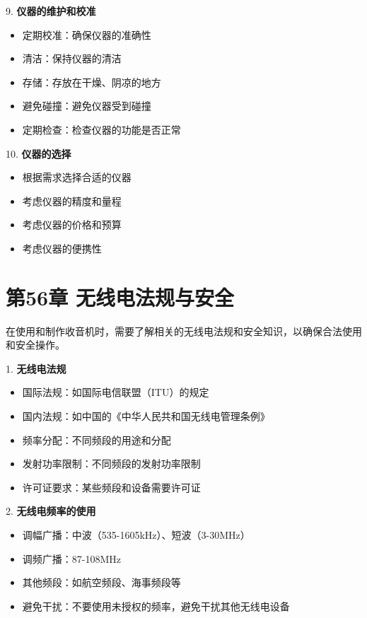 \documentclass[12pt,UTF8]{ctexbook}
\begin{document}
9. \textbf{仪器的维护和校准}
   \begin{itemize}[leftmargin=3.5em]
   \item 定期校准：确保仪器的准确性
   \item 清洁：保持仪器的清洁
   \item 存储：存放在干燥、阴凉的地方
   \item 避免碰撞：避免仪器受到碰撞
   \item 定期检查：检查仪器的功能是否正常
   \end{itemize}

10. \textbf{仪器的选择}
    \begin{itemize}[leftmargin=3.5em]
    \item 根据需求选择合适的仪器
    \item 考虑仪器的精度和量程
    \item 考虑仪器的价格和预算
    \item 考虑仪器的便携性
    \end{itemize}\chapter*{第56章 无线电法规与安全}

在使用和制作收音机时，需要了解相关的无线电法规和安全知识，以确保合法使用和安全操作。

1. \textbf{无线电法规}
   \begin{itemize}[leftmargin=3.5em]
   \item 国际法规：如国际电信联盟（ITU）的规定
   \item 国内法规：如中国的《中华人民共和国无线电管理条例》
   \item 频率分配：不同频段的用途和分配
   \item 发射功率限制：不同频段的发射功率限制
   \item 许可证要求：某些频段和设备需要许可证
   \end{itemize}

2. \textbf{无线电频率的使用}
   \begin{itemize}[leftmargin=3.5em]
   \item 调幅广播：中波（535-1605kHz）、短波（3-30MHz）
   \item 调频广播：87-108MHz
   \item 其他频段：如航空频段、海事频段等
   \item 避免干扰：不要使用未授权的频率，避免干扰其他无线电设备
   \end{itemize}
\end{document}
